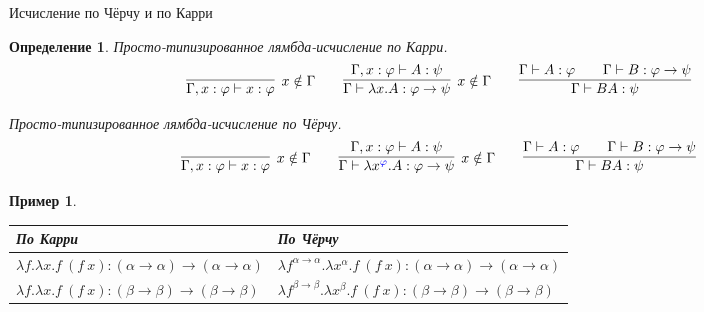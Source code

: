 \documentclass[aspectratio=169]{beamer}
\newtheorem{dfn}{Определение}[section]
\newtheorem{exm}{Пример}[section]
\begin{document}
\begin{frame}{Исчисление по Чёрчу и по Карри}
\begin{dfn}
Просто-типизированное лямбда-исчисление по Карри.
$$\infer[x \notin \Gamma]{\Gamma,x:\varphi \vdash x:\varphi}{} \quad\quad 
  \infer[x \notin \Gamma]{\Gamma\vdash \lambda x.A: \varphi\rightarrow\psi}{\Gamma,x:\varphi\vdash A:\psi} \quad\quad 
  \infer{\Gamma\vdash B A:\psi}{\Gamma\vdash A:\varphi\quad\quad\Gamma\vdash B:\varphi\rightarrow\psi}$$

Просто-типизированное лямбда-исчисление по Чёрчу. 
$$\infer[x \notin \Gamma]{\Gamma,x:\varphi \vdash x:\varphi}{} \quad\quad 
  \infer[x \notin \Gamma]{\Gamma\vdash \lambda x^{\color{blue}\varphi}.A: \varphi\rightarrow\psi}{\Gamma,x:\varphi\vdash A:\psi} \quad\quad 
  \infer{\Gamma\vdash B A:\psi}{\Gamma\vdash A:\varphi\quad\quad\Gamma\vdash B:\varphi\rightarrow\psi}$$
\end{dfn}\pause

\begin{exm}
\begin{tabular}{l|l}
По Карри & По Чёрчу\\\hline
$\lambda f.\lambda x.f\ (f\ x) : (\alpha\rightarrow\alpha)\rightarrow(\alpha\rightarrow\alpha)$ & $\lambda f^{\alpha\rightarrow\alpha}.\lambda x^\alpha.f\ (f\ x) : (\alpha\rightarrow\alpha)\rightarrow(\alpha\rightarrow\alpha)$\\\pause
$\lambda f.\lambda x.f\ (f\ x) : (\beta\rightarrow\beta)\rightarrow(\beta\rightarrow\beta)$ & $\lambda f^{\beta\rightarrow\beta}.\lambda x^\beta.f\ (f\ x) : (\beta\rightarrow\beta)\rightarrow(\beta\rightarrow\beta)$
\end{tabular}
\end{exm}

\end{frame}
\end{document}

